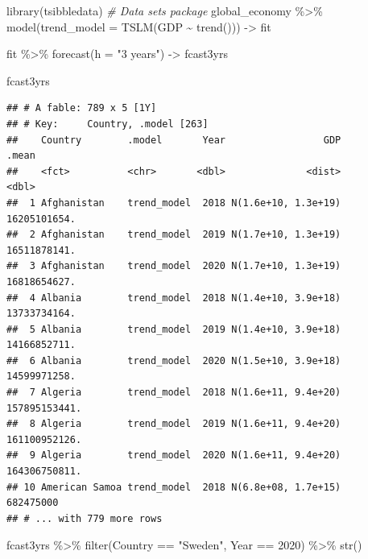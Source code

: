 \documentclass[
]{book}
\newenvironment{Shaded}{\begin{snugshade}}{\end{snugshade}}
\newcommand{\AttributeTok}[1]{\textcolor[rgb]{0.77,0.63,0.00}{#1}}
\newcommand{\CommentTok}[1]{\textcolor[rgb]{0.56,0.35,0.01}{\textit{#1}}}
\newcommand{\DecValTok}[1]{\textcolor[rgb]{0.00,0.00,0.81}{#1}}
\newcommand{\FunctionTok}[1]{\textcolor[rgb]{0.00,0.00,0.00}{#1}}
\newcommand{\NormalTok}[1]{#1}
\newcommand{\OtherTok}[1]{\textcolor[rgb]{0.56,0.35,0.01}{#1}}
\newcommand{\SpecialCharTok}[1]{\textcolor[rgb]{0.00,0.00,0.00}{#1}}
\newcommand{\StringTok}[1]{\textcolor[rgb]{0.31,0.60,0.02}{#1}}
\begin{document}
\begin{Shaded}
\begin{Highlighting}[]
\FunctionTok{library}\NormalTok{(tsibbledata) }\CommentTok{\# Data sets package}
\NormalTok{global\_economy }\SpecialCharTok{\%\textgreater{}\%} \FunctionTok{model}\NormalTok{(}\AttributeTok{trend\_model =} \FunctionTok{TSLM}\NormalTok{(GDP }\SpecialCharTok{\textasciitilde{}} \FunctionTok{trend}\NormalTok{())) }\OtherTok{{-}\textgreater{}}\NormalTok{ fit}
\end{Highlighting}
\end{Shaded}

\begin{Shaded}
\begin{Highlighting}[]
\NormalTok{fit }\SpecialCharTok{\%\textgreater{}\%} \FunctionTok{forecast}\NormalTok{(}\AttributeTok{h =} \StringTok{"3 years"}\NormalTok{) }\OtherTok{{-}\textgreater{}}\NormalTok{ fcast3yrs}

\NormalTok{fcast3yrs}
\end{Highlighting}
\end{Shaded}

\begin{verbatim}
## # A fable: 789 x 5 [1Y]
## # Key:     Country, .model [263]
##    Country        .model       Year                 GDP         .mean
##    <fct>          <chr>       <dbl>              <dist>         <dbl>
##  1 Afghanistan    trend_model  2018 N(1.6e+10, 1.3e+19)  16205101654.
##  2 Afghanistan    trend_model  2019 N(1.7e+10, 1.3e+19)  16511878141.
##  3 Afghanistan    trend_model  2020 N(1.7e+10, 1.3e+19)  16818654627.
##  4 Albania        trend_model  2018 N(1.4e+10, 3.9e+18)  13733734164.
##  5 Albania        trend_model  2019 N(1.4e+10, 3.9e+18)  14166852711.
##  6 Albania        trend_model  2020 N(1.5e+10, 3.9e+18)  14599971258.
##  7 Algeria        trend_model  2018 N(1.6e+11, 9.4e+20) 157895153441.
##  8 Algeria        trend_model  2019 N(1.6e+11, 9.4e+20) 161100952126.
##  9 Algeria        trend_model  2020 N(1.6e+11, 9.4e+20) 164306750811.
## 10 American Samoa trend_model  2018 N(6.8e+08, 1.7e+15)    682475000 
## # ... with 779 more rows
\end{verbatim}

\begin{Shaded}
\begin{Highlighting}[]
\NormalTok{fcast3yrs }\SpecialCharTok{\%\textgreater{}\%} \FunctionTok{filter}\NormalTok{(Country }\SpecialCharTok{==} \StringTok{"Sweden"}\NormalTok{, Year }\SpecialCharTok{==} \DecValTok{2020}\NormalTok{) }\SpecialCharTok{\%\textgreater{}\%} \FunctionTok{str}\NormalTok{()}
\end{Highlighting}
\end{Shaded}
\end{document}
